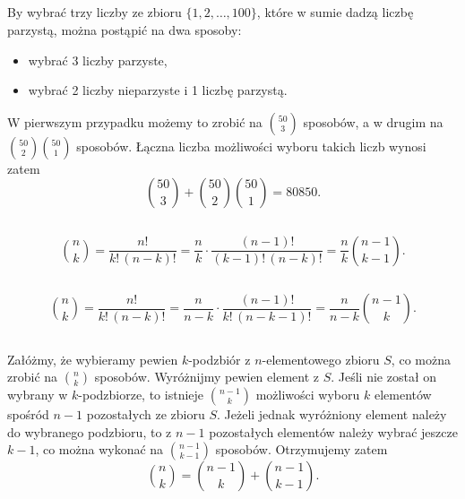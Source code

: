 \subsection{} %
By wybrać trzy liczby ze zbioru $\{1,2,\dots,100\}$, które w sumie dadzą liczbę parzystą, można postąpić na dwa sposoby:
\begin{itemize}
	\item wybrać 3 liczby parzyste,
	\item wybrać 2 liczby nieparzyste i 1 liczbę parzystą.
\end{itemize}
W pierwszym przypadku możemy to zrobić na $\binom{50}{3}$ sposobów, a w drugim na $\binom{50}{2}\binom{50}{1}$ sposobów. Łączna liczba możliwości wyboru takich liczb wynosi zatem
\[
	\binom{50}{3}+\binom{50}{2}\binom{50}{1} = 80850.
\]

\subsection{} %
\[
	\binom{n}{k} = \frac{n!}{k!\,(n-k)!} = \frac{n}{k}\cdot\frac{(n-1)!}{(k-1)!\,(n-k)!} = \frac{n}{k}\binom{n-1}{k-1}.
\]

\subsection{} %
\[
	\binom{n}{k} = \frac{n!}{k!\,(n-k)!} = \frac{n}{n-k}\cdot\frac{(n-1)!}{k!\,(n-k-1)!} = \frac{n}{n-k}\binom{n-1}{k}.
\]

\subsection{} %
Załóżmy, że wybieramy pewien $k$-podzbiór z $n$-elementowego zbioru $S$, co można zrobić na $\binom{n}{k}$ sposobów. Wyróżnijmy pewien element z $S$. Jeśli nie został on wybrany w $k$-podzbiorze, to istnieje $\binom{n-1}{k}$ możliwości wyboru $k$ elementów spośród $n-1$ pozostałych ze zbioru $S$. Jeżeli jednak wyróżniony element należy do wybranego podzbioru, to z $n-1$ pozostałych elementów należy wybrać jeszcze $k-1$, co można wykonać na $\binom{n-1}{k-1}$ sposobów. Otrzymujemy zatem
\[
	\binom{n}{k} = \binom{n-1}{k}+\binom{n-1}{k-1}.
\]

